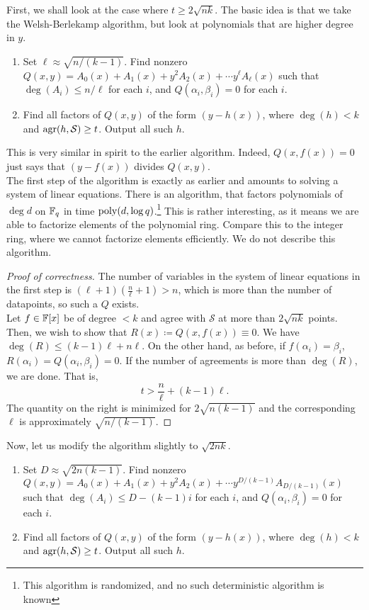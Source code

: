 		First, we shall look at the case where $t \ge 2\sqrt{nk}$. %
		The basic idea is that we take the Welsh-Berlekamp algorithm, but look at polynomials that are higher degree in $y$.

		\begin{enumerate}
			\item Set $\ell \approx \sqrt{n/(k-1)}$. Find nonzero $Q(x,y) = A_0(x) + A_1(x) + y^2 A_2(x) + \cdots y^\ell A_\ell(x)$ such that $\deg(A_i) \le n/\ell$ for each $i$, and $Q(\alpha_i,\beta_i) = 0$ for each $i$.
			\item Find all factors of $Q(x,y)$ of the form $(y - h(x))$, where $\deg(h) < k$ and $\operatorname{agr}(h,\mathcal{S}) \ge t$. Output all such $h$.
		\end{enumerate}
		This is very similar in spirit to the earlier algorithm. Indeed, $Q(x,f(x)) = 0$ just says that $(y-f(x))$ divides $Q(x,y)$. \\
		The first step of the algorithm is exactly as earlier and amounts to solving a system of linear equations. There is an algorithm, that factors polynomials of $\deg d$ on $\mathbb{F}_q$ in time $\operatorname{poly}(d,\log q)$.\footnote{This algorithm is randomized, and no such deterministic algorithm is known} This is rather interesting, as it means we are able to factorize elements of the polynomial ring. Compare this to the integer ring, where we cannot factorize elements efficiently. We do not describe this algorithm.

		\begin{proof}[Proof of correctness]
			The number of variables in the system of linear equations in the first step is $(\ell+1)\left(\frac{n}{\ell}+1\right) > n$, which is more than the number of datapoints, so such a $Q$ exists.\\
			Let $f \in \mathbb{F}[x]$ be of degree $<k$ and agree with $\mathcal{S}$ at more than $2\sqrt{nk}$ points. Then, we wish to show that $R(x) \coloneqq Q(x,f(x)) \equiv 0$. We have $\deg (R)\le (k-1)\ell + n\ell$. On the other hand, as before, if $f(\alpha_i) = \beta_i$, $R(\alpha_i) = Q(\alpha_i,\beta_i) = 0$. If the number of agreements is more than $\deg(R)$, we are done. That is,
			\[ t > \frac{n}{\ell} + (k-1)\ell. \]
			The quantity on the right is minimized for $2\sqrt{n(k-1)}$ and the corresponding $\ell$ is approximately $\sqrt{n/(k-1)}$.
		\end{proof}

		Now, let us modify the algorithm slightly to $\sqrt{2nk}$.
		\begin{enumerate}
			\item Set $D \approx \sqrt{2n(k-1)}$. Find nonzero $Q(x,y) = A_0(x) + A_1(x) + y^2 A_2(x) + \cdots y^{D/(k-1)} A_{D/(k-1)}(x)$ such that $\deg(A_i) \le D - (k-1)i$ for each $i$, and $Q(\alpha_i,\beta_i) = 0$ for each $i$.
			\item Find all factors of $Q(x,y)$ of the form $(y - h(x))$, where $\deg(h) < k$ and $\operatorname{agr}(h,\mathcal{S}) \ge t$. Output all such $h$.
		\end{enumerate}

